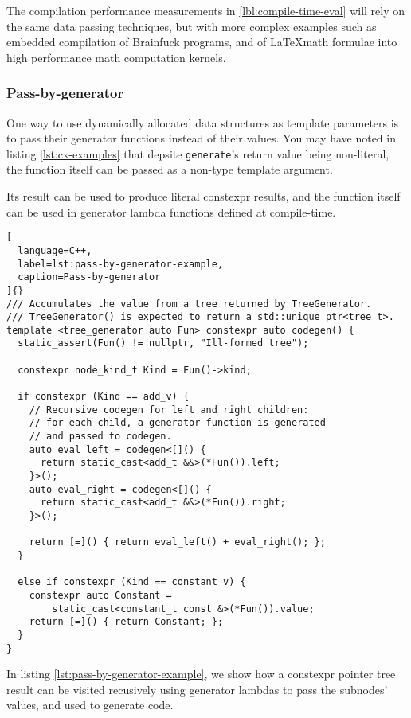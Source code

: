 \documentclass[../main]{subfiles}
\begin{document}
The compilation performance measurements in \ref{lbl:compile-time-eval} will
rely on the same data passing techniques, but with more complex examples such
as embedded compilation of Brainfuck programs, and of \LaTeX math formulae
into high performance math computation kernels.

\subsubsection{
  Pass-by-generator
}

\label{lbl:pbg-technique}

One way to use dynamically allocated data structures as template parameters
is to pass their generator functions instead of their values.
You may have noted in listing \ref{lst:cx-examples} that depsite
\lstinline{generate}'s return value being non-literal, the function itself
can be passed as a non-type template argument.

Its result can be used to produce literal \gls{constexpr} results,
and the function itself can be used in generator lambda functions
defined at compile-time.

\begin{lstlisting}[
  language=C++,
  label=lst:pass-by-generator-example,
  caption=Pass-by-generator
]{}
/// Accumulates the value from a tree returned by TreeGenerator.
/// TreeGenerator() is expected to return a std::unique_ptr<tree_t>.
template <tree_generator auto Fun> constexpr auto codegen() {
  static_assert(Fun() != nullptr, "Ill-formed tree");

  constexpr node_kind_t Kind = Fun()->kind;

  if constexpr (Kind == add_v) {
    // Recursive codegen for left and right children:
    // for each child, a generator function is generated
    // and passed to codegen.
    auto eval_left = codegen<[]() {
      return static_cast<add_t &&>(*Fun()).left;
    }>();
    auto eval_right = codegen<[]() {
      return static_cast<add_t &&>(*Fun()).right;
    }>();

    return [=]() { return eval_left() + eval_right(); };
  }

  else if constexpr (Kind == constant_v) {
    constexpr auto Constant =
        static_cast<constant_t const &>(*Fun()).value;
    return [=]() { return Constant; };
  }
}
\end{lstlisting}

In listing \ref{lst:pass-by-generator-example}, we show how a \gls{constexpr}
pointer tree result can be visited recusively using generator lambdas
to pass the subnodes' values, and used to generate code.
\end{document}
